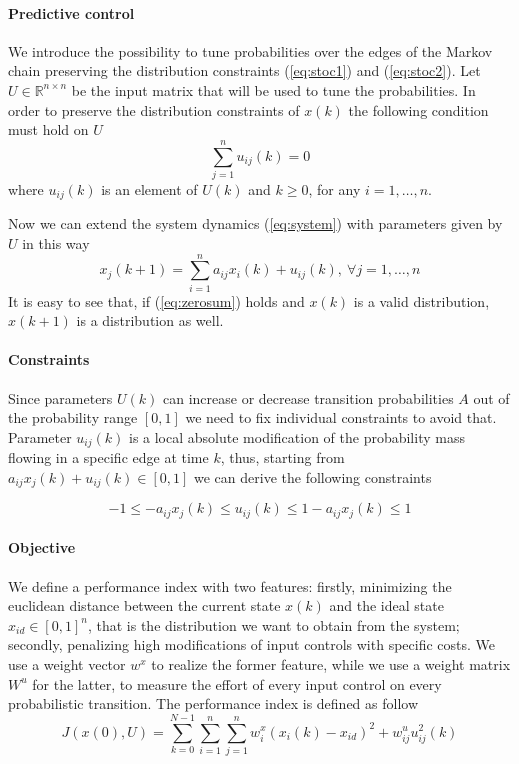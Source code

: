 \documentclass[a4paper, 11pt]{article}
\theoremstyle{definition}
\theoremstyle{remark}
\begin{document}
\paragraph{Predictive control}
We introduce the possibility to tune probabilities over the edges of the Markov chain preserving the distribution constraints (\ref{eq:stoc1}) and (\ref{eq:stoc2}). Let $U \in \mathbb{R}^{n\times n}$ be the input matrix that will be used to tune the probabilities. In order to preserve the distribution constraints of $x(k)$ the following condition must hold on $U$
\begin{equation} \label{eq:zerosum}
	\sum_{j=1}^n u_{ij}(k) = 0
\end{equation}
where $u_{ij}(k)$ is an element of $U(k)$ and $k \geq 0$, for any $i = 1,\dots,n$.

Now we can extend the system dynamics (\ref{eq:system}) with parameters given by $U$ in this way
\begin{equation} \label{eq:system_extended}
	x_j(k+1) = \sum_{i=1}^n a_{ij} x_i(k) + u_{ij}(k), \ \forall j = 1,\dots,n
\end{equation}
It is easy to see that, if (\ref{eq:zerosum}) holds and $x(k)$ is a valid distribution, $x(k+1)$ is a distribution as well.

\paragraph{Constraints}
Since parameters $U(k)$ can increase or decrease transition probabilities $A$ out of the probability range $[0,1]$ we need to fix individual constraints to avoid that. Parameter $u_{ij}(k)$ is a local absolute modification of the probability mass flowing in a specific edge at time $k$, thus, starting from $a_{ij}x_j(k)+u_{ij}(k) \in [0,1]$ we can derive the following constraints

\begin{equation} \label{eq:constraints}
	-1 \leq -a_{ij}x_j(k) \leq u_{ij}(k) \leq 1-a_{ij}x_{j}(k) \leq 1
\end{equation}

\paragraph{Objective} %
\label{par:objective2}
We define a performance index with two features: firstly, minimizing the euclidean distance between the current state $x(k)$ and the ideal state $x_{id} \in [0,1]^n$, that is the distribution we want to obtain from the system; secondly, penalizing high modifications of input controls with specific costs. We use a weight vector $w^x$ to realize the former feature, while we use a weight matrix $W^u$ for the latter, to measure the effort of every input control on every probabilistic transition. The performance index is defined as follow
\begin{equation} \label{eq:index_ext}
	J(x(0),U) = \sum_{k=0}^{N-1}\sum_{i=1}^{n}\sum_{j=1}^{n} w_i^x(x_i(k) - x_{id})^2 + w_{ij}^u u^2_{ij}(k)
\end{equation}
\end{document}
